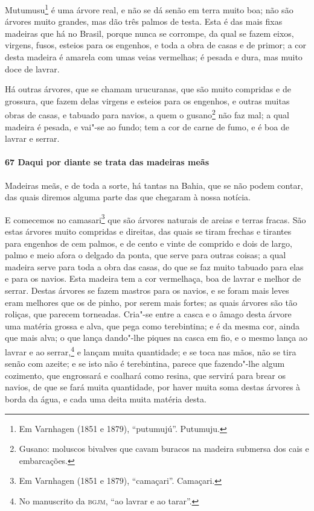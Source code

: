 Mutumusu\footnote{ Em Varnhagen (1851 e 1879), ``putumujú''. Putumuju.} é uma árvore real,
e não se dá senão em terra muito boa; não são árvores muito grandes, mas dão três palmos
de testa. Esta é das mais fixas madeiras que há no Brasil, porque nunca se corrompe, da
qual se fazem eixos, virgens, fusos, esteios para os engenhos, e toda a obra de casas e de
primor; a cor desta madeira é amarela com umas veias vermelhas; é pesada e dura, mas muito
doce de lavrar.

Há outras árvores, que se chamam urucuranas, que são muito compridas e de grossura, que
fazem delas virgens e esteios para os engenhos, e outras muitas obras de casas, e tabuado
para navios, a quem o gusano\footnote{ Gusano: moluscos bivalves que cavam buracos na
madeira submersa dos cais e embarcações.} não faz mal; a qual madeira é pesada, e vai"-se
ao fundo; tem a cor de carne de fumo, e é boa de lavrar e serrar.

\paragraph{67 Daqui por diante se trata das madeiras meãs}

Madeiras meãs, e de toda a sorte, há tantas na Bahia, que se não podem contar, das quais
diremos alguma parte das que chegaram à nossa notícia.

E comecemos no camasari\footnote{ Em Varnhagen (1851 e 1879), ``camaçari''. Camaçari.} que
são árvores naturais de areias e terras fracas. São estas árvores muito compridas e
direitas, das quais se tiram frechas e tirantes para engenhos de cem palmos, e de cento e
vinte de comprido e dois de largo, palmo e meio afora o delgado da ponta, que serve para
outras coisas; a qual madeira serve para toda a obra das casas, do que se faz muito
tabuado para elas e para os navios. Esta madeira tem a cor vermelhaça, boa de lavrar e
melhor de serrar. Destas árvores se fazem mastros para os navios, e se foram mais leves
eram melhores que os de pinho, por serem mais fortes; as quais árvores são tão roliças,
que parecem torneadas. Cria"-se entre a casca e o âmago desta árvore uma matéria grossa e
alva, que pega como terebintina; e é da mesma cor, ainda que mais alva; o que lança
dando"-lhe piques na casca em fio, e o mesmo lança ao lavrar e ao serrar,\footnote{ No
manuscrito da \textsc{bgjm}, ``ao lavrar e ao tarar''.} e lançam muita quantidade; e se
toca nas mãos, não se tira senão com azeite; e se isto não é terebintina, parece que
fazendo"-lhe algum cozimento, que engrossará e coalhará como resina, que servirá para brear
os navios, de que se fará muita quantidade, por haver muita soma destas árvores à borda da
água, e cada uma deita muita matéria desta.

